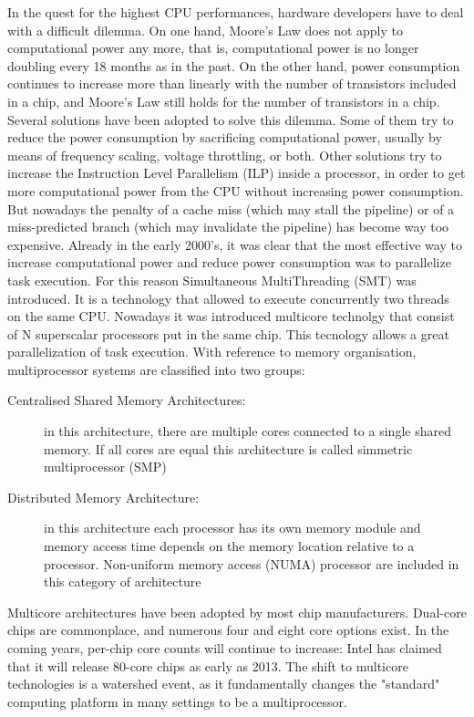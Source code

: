 In the quest for the highest CPU performances, hardware developers have to deal with a difficult dilemma. On one hand, Moore's Law does not apply to 
computational power any more, that is, computational power is no longer doubling every 18 months as in the past. On the other hand, power consumption 
continues to increase more than linearly with the number of transistors included in a chip, and Moore's Law still holds for the number of transistors 
in a chip.
Several solutions have been adopted to solve this dilemma. Some of them try to reduce the power consumption by sacrificing computational power,
usually by means of frequency scaling, voltage throttling, or both. Other solutions try to increase the Instruction Level Parallelism (ILP) inside a 
processor, in order to get more computational power from the CPU without increasing power consumption. But nowadays the penalty of a cache miss 
(which may stall the pipeline) or of a miss-predicted branch (which may invalidate the pipeline) has become way too expensive.
Already in the early 2000's, it was clear that the most effective way to increase computational power and reduce power consumption was to parallelize
task execution. For this reason Simultaneous MultiThreading (SMT) was introduced. It is a technology that allowed to execute 
concurrently two threads on the same CPU. Nowadays it was introduced multicore
technolgy that consist of N superscalar processors put in the same chip. This tecnology allows a great parallelization of task execution.
With reference to memory organisation, multiprocessor systems are classified into two groups:

\begin{description}
	\item [Centralised Shared Memory Architectures:] in this architecture, there are multiple cores connected to a single shared memory. If all cores are
	      equal this architecture is called simmetric multiprocessor (SMP)
	\item [Distributed Memory Architecture:] in this architecture each processor has its own memory module and memory access time depends on the memory 
	      location relative to a processor. Non-uniform memory access (NUMA) processor are included in this category of architecture
\end{description}

Multicore architectures have been adopted by most chip manufacturers. Dual-core chips are commonplace, and numerous four and eight core options exist. 
In the coming years, per-chip core counts will continue to increase: Intel has claimed that it will release 80-core chips as early as 2013. 
The shift to multicore technologies is a watershed event, as it fundamentally changes the "standard" computing platform in many settings to be a 
multiprocessor.

